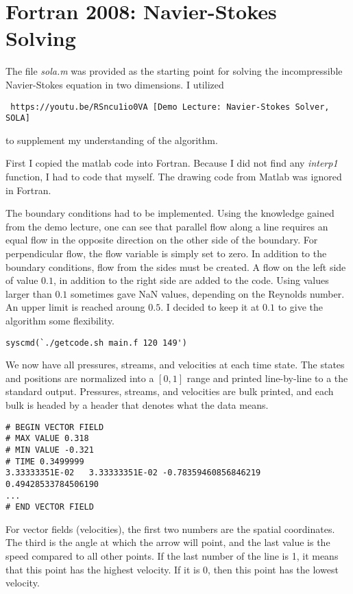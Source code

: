 \documentclass[listof=totoc]{report}
\begin{document}
\section{Fortran 2008: Navier-Stokes Solving}
The file \emph{sola.m} was provided as the starting point for solving the incompressible Navier-Stokes equation in two dimensions.
I utilized \begin{verbatim} https://youtu.be/RSncu1io0VA [Demo Lecture: Navier-Stokes Solver, SOLA] \end{verbatim} to supplement my understanding of the algorithm.

First I copied the matlab code into Fortran. Because I did not find any \emph{interp1} function, I had to code that myself. The drawing code from Matlab was ignored in Fortran.

The boundary conditions had to be implemented. Using the knowledge gained from the demo lecture, one can see that parallel flow along a line requires an equal flow in the opposite direction on the other side of the boundary. For perpendicular flow, the flow variable is simply set to zero. In addition to the boundary conditions, flow from the sides must be created. A flow on the left side of value $0.1$, in addition to the right side are added to the code.
Using values larger than $0.1$ sometimes gave NaN values, depending on the Reynolds number. An upper limit is reached aroung $0.5$. I decided to keep it at $0.1$ to give the algorithm some flexibility.

\begin{verbatim}
syscmd(`./getcode.sh main.f 120 149')
\end{verbatim}

We now have all pressures, streams, and velocities at each time state. The states and positions are normalized into a $[0, 1]$ range and printed line-by-line to a the standard output. Pressures, streams, and velocities are bulk printed, and each bulk is headed by a header that denotes what the data means.

\begin{verbatim}
# BEGIN VECTOR FIELD
# MAX VALUE 0.318
# MIN VALUE -0.321
# TIME 0.3499999
3.33333351E-02   3.33333351E-02 -0.78359460856846219       0.49428533784506190
...
# END VECTOR FIELD
\end{verbatim}

For vector fields (velocities), the first two numbers are the spatial coordinates. The third is the angle at which the arrow will point, and the last value is the speed compared to all other points. If the last number of the line is 1, it means that this point has the highest velocity. If it is 0, then this point has the lowest velocity.
\end{document}
